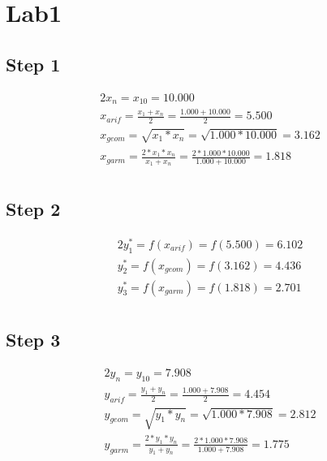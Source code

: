 \documentclass{article}%
\begin{document}
%
\normalsize%
\section{Lab1}%
\label{sec:Lab1}%
\subsection{Step 1}%
\label{subsec:Step1}%
\begin{alignat*}{2}%
x_n = x_{10} = {10.000} \\%
x_{arif}
        = \frac {x_1 + x_n} 2
        = \frac {1.000 + 10.000} 2
        = 5.500 \\%
x_{geom}
        = \sqrt {x_1 * x_n}
        = \sqrt {1.000 * 10.000}
        = 3.162 \\%
x_{garm}
        = \frac {2 * x_1 * x_n} {x_1 + x_n}
        = \frac {2 * 1.000 * 10.000} {1.000 + 10.000}
        = 1.818 \\%
\end{alignat*}

%
\subsection{Step 2}%
\label{subsec:Step2}%
\begin{alignat*}{2}%
y_1^*
                        = f(x_{arif})
                        = f(5.500)
                        = 6.102 \\%
y_2^*
                        = f(x_{geom})
                        = f(3.162)
                        = 4.436 \\%
y_3^*
                        = f(x_{garm})
                        = f(1.818)
                        = 2.701 \\%
\end{alignat*}

%
\subsection{Step 3}%
\label{subsec:Step3}%
\begin{alignat*}{2}%
y_n = y_{10} = {7.908} \\%
y_{arif}
        = \frac {y_1 + y_n} 2
        = \frac {1.000 + 7.908} 2
        = 4.454 \\%
y_{geom}
        = \sqrt {y_1 * y_n}
        = \sqrt {1.000 * 7.908}
        = 2.812 \\%
y_{garm}
        = \frac {2 * y_1 * y_n} {y_1 + y_n}
        = \frac {2 * 1.000 * 7.908} {1.000 + 7.908}
        = 1.775 \\%
\end{alignat*}
\end{document}
